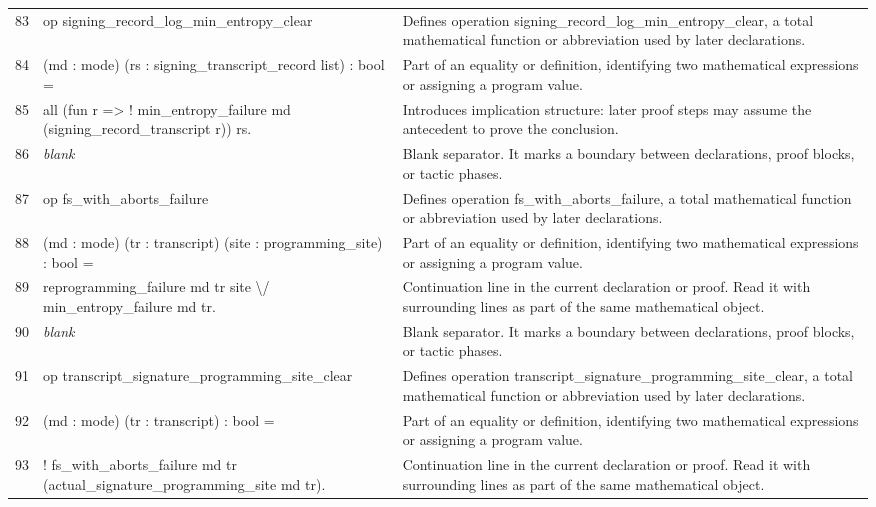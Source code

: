\documentclass[10pt]{article}
\begin{document}
\begin{longtable}{r L{0.53\textwidth} L{0.37\textwidth}}
83 & {\ttfamily\scriptsize op signing\_record\_log\_min\_entropy\_clear} & Defines operation signing\_record\_log\_min\_entropy\_clear, a total mathematical function or abbreviation used by later declarations. \\
84 & {\ttfamily\scriptsize    (md : mode) (rs : signing\_transcript\_record list) : bool =} & Part of an equality or definition, identifying two mathematical expressions or assigning a program value. \\
85 & {\ttfamily\scriptsize   all (fun r => ! min\_entropy\_failure md (signing\_record\_transcript r)) rs.} & Introduces implication structure: later proof steps may assume the antecedent to prove the conclusion. \\
86 & {\ttfamily\scriptsize \emph{blank}} & Blank separator.  It marks a boundary between declarations, proof blocks, or tactic phases. \\
87 & {\ttfamily\scriptsize op fs\_with\_aborts\_failure} & Defines operation fs\_with\_aborts\_failure, a total mathematical function or abbreviation used by later declarations. \\
88 & {\ttfamily\scriptsize    (md : mode) (tr : transcript) (site : programming\_site) : bool =} & Part of an equality or definition, identifying two mathematical expressions or assigning a program value. \\
89 & {\ttfamily\scriptsize   reprogramming\_failure md tr site \textbackslash{}/ min\_entropy\_failure md tr.} & Continuation line in the current declaration or proof.  Read it with surrounding lines as part of the same mathematical object. \\
90 & {\ttfamily\scriptsize \emph{blank}} & Blank separator.  It marks a boundary between declarations, proof blocks, or tactic phases. \\
91 & {\ttfamily\scriptsize op transcript\_signature\_programming\_site\_clear} & Defines operation transcript\_signature\_programming\_site\_clear, a total mathematical function or abbreviation used by later declarations. \\
92 & {\ttfamily\scriptsize    (md : mode) (tr : transcript) : bool =} & Part of an equality or definition, identifying two mathematical expressions or assigning a program value. \\
93 & {\ttfamily\scriptsize   ! fs\_with\_aborts\_failure md tr (actual\_signature\_programming\_site md tr).} & Continuation line in the current declaration or proof.  Read it with surrounding lines as part of the same mathematical object. \\

\end{longtable}
\end{document}
